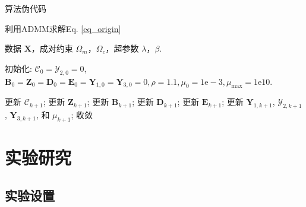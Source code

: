 \documentclass{beamer}
\begin{document}
\begin{frame}{算法伪代码}
\begin{algorithm}[H]
        \small
		\renewcommand{\algorithmicrequire}{\textbf{输入：}}
		\renewcommand{\algorithmicensure}{\textbf{Output:}}
		\caption{利用ADMM求解Eq. \eqref{eq_origin}}
		\label{alg1}
		\begin{algorithmic}[1]
			\REQUIRE 数据 $\mathbf{X}$，成对约束 $\Omega_{m}$，$\Omega_{c}$，超参数 $\lambda$，$\beta$. 
			
			\STATE 初始化: $\mathcal{\mathcal{C}}_{0}\!=\!\mathcal{Y}_{2,0}\!=\!0$, $\mathbf{B}_{0}\!=\!\mathbf{Z}_{0}=\mathbf{D}_{0}\!=\!\mathbf{E}_{0}\!=\!\mathbf{Y}_{1,0}\!=\!\mathbf{Y}_{3,0}\!=\!0, \rho\!=\!1.1, \mu_{0}\!=\!1 \mathrm{e}\!-\!3, \mu_{\max }\!=\!1 \mathrm{e} 10$.
			
			\REPEAT
			
			\STATE 更新 $\mathcal{C}_{k+1}$;
			\STATE 更新 $\mathbf{Z}_{k+1}$;
			\STATE 更新 $\mathbf{B}_{k+1}$;
			\STATE 更新 $\mathbf{D}_{k+1}$;
			\STATE 更新 $\mathbf{E}_{k+1}$;
			\STATE 更新 $\mathbf{Y}_{1,k+1}$, $\mathcal{Y}_{2,k+1}$, $\mathbf{Y}_{3,k+1}$, 和 $\mu_{k+1}$;
			\UNTIL 收敛
		\end{algorithmic}  
	\end{algorithm}
\end{frame}


\section{实验研究}

\subsection{实验设置}
\end{document}
